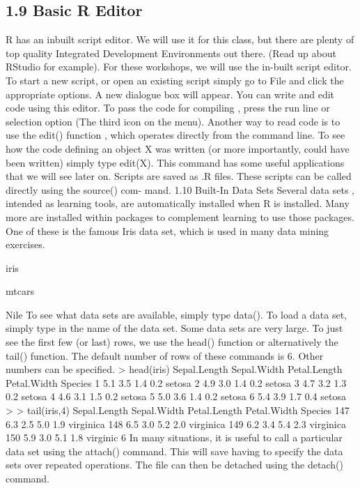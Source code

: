 \subsection{1.9 Basic R Editor}
R has an inbuilt script editor. We will use it for this class, but there are plenty of top quality
Integrated Development Environments out there. (Read up about RStudio for example).
For these workshops, we will use the in-built script editor.
To start a new script, or open an existing script simply go to File and click the appropriate
options. A new dialogue box will appear. You can write and edit code using this editor.
To pass the code for compiling , press the run line or selection option (The third icon
on the menu).
Another way to read code is to use the edit() function , which operates directly from the
command line. To see how the code defining an object X was written (or more importantly,
could have been written) simply type edit(X). This command has some useful applications
that we will see later on.
Scripts are saved as .R files. These scripts can be called directly using the source() com-
mand.
1.10 Built-In Data Sets
Several data sets , intended as learning tools, are automatically installed when R is installed.
Many more are installed within packages to complement learning to use those packages. One
of these is the famous Iris data set, which is used in many data mining exercises.
\item iris
\item mtcars
\item Nile
To see what data sets are available, simply type data(). To load a data set, simply type in the
name of the data set. Some data sets are very large. To just see the first few (or last) rows, we
use the head() function or alternatively the tail() function. The default number of rows of
these commands is 6. Other numbers can be specified.
> head(iris)
Sepal.Length Sepal.Width Petal.Length Petal.Width Species
1 5.1 3.5 1.4 0.2 setosa
2 4.9 3.0 1.4 0.2 setosa
3 4.7 3.2 1.3 0.2 setosa
4 4.6 3.1 1.5 0.2 setosa
5 5.0 3.6 1.4 0.2 setosa
6 5.4 3.9 1.7 0.4 setosa
>
> tail(iris,4)
Sepal.Length Sepal.Width Petal.Length Petal.Width Species
147 6.3 2.5 5.0 1.9 virginica
148 6.5 3.0 5.2 2.0 virginica
149 6.2 3.4 5.4 2.3 virginica
150 5.9 3.0 5.1 1.8 virginic
6
In many situations, it is useful to call a particular data set using the attach() command. This
will save having to specify the data sets over repeated operations. The file can then be detached
using the detach() command.

